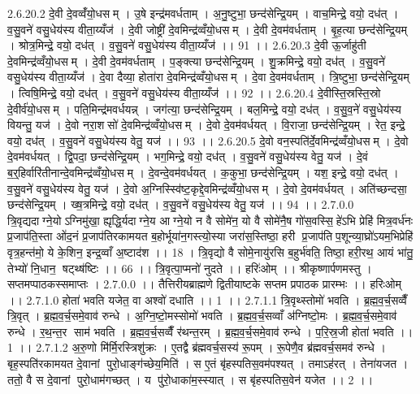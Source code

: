 2.6.20.2
दे॒वी दे॒वव्वँ॑यो॒धसम् । उ॒षे इन्द्र॑मवर्धताम् । अ॒नु॒ष्टुभा॒ छन्द॑सेन्द्रि॒यम् । वाच॒मिन्द्रे॒ वयो॒ दध॑त् । व॒सु॒वने॑ वसु॒धेय॑स्य वीता॒य्यँज॑ । दे॒वी जोष्ट्री॑ दे॒वमिन्द्र॑व्वँयो॒धसम् । दे॒वी दे॒वम॑वर्धताम् । बृ॒ह॒त्या छन्द॑सेन्द्रि॒यम् । श्रोत्र॒मिन्द्रे॒ वयो॒ दध॑त् । व॒सु॒वने॑ वसु॒धेय॑स्य वीता॒य्यँज॑ ।। 91 ।।
2.6.20.3
दे॒वी ऊ॒र्जाहु॑ती दे॒वमिन्द्र॑व्वँयो॒धसम् । दे॒वी दे॒वम॑वर्धताम् । प॒ङ्क्त्या छन्द॑सेन्द्रि॒यम् । शु॒क्रमिन्द्रे॒ वयो॒ दध॑त् । व॒सु॒वने॑ वसु॒धेय॑स्य वीता॒य्यँज॑ । दे॒वा दैव्या॒ होता॑रा दे॒वमिन्द्र॑व्वँयो॒धसम् । दे॒वा दे॒वम॑वर्धताम् । त्रि॒ष्टुभा॒ छन्द॑सेन्द्रि॒यम् । त्विषि॒मिन्द्रे॒ वयो॒ दध॑त् । व॒सु॒वने॑ वसु॒धेय॑स्य वीता॒य्यँज॑ ।। 92 ।।
2.6.20.4
दे॒वीस्ति॒स्रस्ति॒स्रो दे॒वीर्व॑यो॒धसम् । पति॒मिन्द्र॑मवर्धयन्न् । जग॑त्या॒ छन्द॑सेन्द्रि॒यम् । बल॒मिन्द्रे॒ वयो॒ दध॑त् । व॒सु॒व॒ने॑ वसु॒धेय॑स्य वियन्तु॒ यज॑ । दे॒वो नरा॒शसो॑ दे॒वमिन्द्र॑व्वँयो॒धसम् । दे॒वो दे॒वम॑वर्धयत् । वि॒राजा॒ छन्द॑सेन्द्रि॒यम् । रेत॒ इन्द्रे॒ वयो॒ दध॑त् । व॒सु॒वने॑ वसु॒धेय॑स्य वेतु॒ यज॑ ।। 93 ।।
2.6.20.5
दे॒वो वन॒स्पति॑र्दे॒वमिन्द्र॑व्वँयो॒धसम् । दे॒वो दे॒वम॑वर्धयत् । द्वि॒पदा॒ छन्द॑सेन्द्रि॒यम् । भग॒मिन्द्रे॒ वयो॒ दध॑त् । व॒सु॒वने॑ वसु॒धेय॑स्य वेतु॒ यज॑ । दे॒वं ब॒र्॒हिर्वारि॑तीनान्दे॒वमिन्द्र॑व्वँयो॒धसम् । दे॒वन्दे॒वम॑वर्धयत् । क॒कुभा॒ छन्द॑सेन्द्रि॒यम् । यश॒ इन्द्रे॒ वयो॒ दध॑त् । व॒सु॒वने॑ वसु॒धेय॑स्य वेतु॒ यज॑ । दे॒वो अ॒ग्निस्स्वि॑ष्ट॒कृद्दे॒वमिन्द्र॑व्वँयो॒धसम् । दे॒वो दे॒वम॑वर्धयत् । अति॑च्छन्दसा॒ छन्द॑सेन्द्रि॒यम् । ख्ष॒त्रमिन्द्रे॒ वयो॒ दध॑त् । व॒सु॒वने॑ वसु॒धेय॑स्य वेतु॒ यज॑ ।। 94 ।।
2.7.0.0
त्रि॒वृद्यदाग्ने॒योऽग्निमु॑खा॒ ह्यृद्धि॒र्यदाग्ने॒य आग्ने॒यो न वै सोमे॑न॒ यो वै सोमे॑नै॒ष गो॑स॒वस्सि॒॒हे॑ऽभि प्रेहि॑ मित्र॒वर्ध॑नः प्र॒जाप॑ति॒स्ता ओ॑द॒नं प्र॒जाप॑तिरकामयत ब॒होर्भूया॑न॒गस्त्यो॒स्या जरा॑स॒स्तिष्ठा॒ हरी प्र॒जाप॑तिप॒शून्व्या॒घ्रो॑ऽयम॒भिप्रेहि॑ वृत्र॒हन्त॑मो॒ ये के॒शिन॒ इन्द्र॒व्वाँ अ॒ष्टाद॑श ।। 18 । त्रि॒वृद्यो वै सोमे॒नायु॑रसि ब॒हुर्भ॑वति॒ तिष्ठा॒ हरी॒रथ॒ आयं भा॑तु॒ तेभ्यो॑ नि॒धान॒॒ षट्थ्ष॑ष्टिः ।। 66 ।। त्रि॒वृत्पा॒प्मनो॑ नुदते ।। हरिः॑ओम् ।। श्रीकृष्णार्पणमस्तु । सप्तमप्पाठकस्समाप्तः ।
2.7.0.0
।। तैत्तिरीयब्राह्मणे द्वितीयाष्टके सप्तम प्रपाठक प्रारम्भः ।। हरिःओम् ।।
2.7.1.0
होता॑ भवति यजेत॒ वा अश्वो॑ दधाति ।। 1 ।।
2.7.1.1
त्रि॒वृथ्स्तोमो॑ भवति । ब्र॒ह्म॒व॒र्च॒सव्वैँ त्रि॒वृत् । ब्र॒ह्म॒व॒र्च॒समे॒वाव॑ रुन्धे । अ॒ग्नि॒ष्टो॒मस्सोमो॑ भवति । ब्र॒ह्म॒व॒र्च॒सव्वाँ अ॑ग्निष्टो॒मः । ब्र॒ह्म॒व॒र्च॒समे॒वाव॑ रुन्धे । र॒थ॒न्त॒र साम॑ भवति । ब्र॒ह्म॒व॒र्च॒सव्वैँ र॑थन्त॒रम् । ब्र॒ह्म॒व॒र्च॒समे॒वाव॑ रुन्धे । प॒रि॒स्र॒जी होता॑ भवति ।। 1 ।।
2.7.1.2
अ॒रु॒णो मि॑र्मि॒रस्त्रिशु॑क्रः । ए॒तद्वै ब्र॑ह्मवर्च॒सस्य॑ रू॒पम् । रू॒पेणै॒व ब्र॑ह्मवर्च॒समव॑ रुन्धे । बृह॒स्पति॑रकामयत दे॒वानां पुरो॒धाङ्ग॑च्छेय॒मिति॑ । स ए॒तं बृ॑हस्पतिस॒वम॑पश्यत् । तमाऽह॑रत् । तेना॑यजत । ततो॒ वै स दे॒वानां पुरो॒धाम॑गच्छत् । य पु॑रो॒धाका॑म॒स्स्यात् । स बृ॑हस्पतिस॒वेन॑ यजेत ।। 2 ।।
